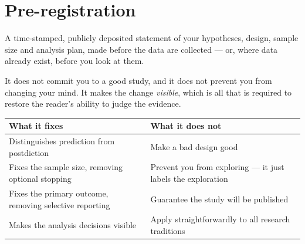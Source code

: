 \section{Pre-registration}

\begin{definitionbox}
A time-stamped, publicly deposited statement of your hypotheses, design,
sample size and analysis plan, made before the data are collected --- or, where
data already exist, before you look at them.

\medskip
It does not commit you to a good study, and it does not prevent you from
changing your mind. It makes the change \emph{visible}, which is all that is
required to restore the reader's ability to judge the evidence.
\end{definitionbox}

\begin{center}
\small
\begin{tabular}{@{}L{4.2cm}L{10.1cm}@{}}
\toprule
\textbf{What it fixes} & \textbf{What it does not} \\
\midrule
Distinguishes prediction from postdiction
  & Make a bad design good \\
Fixes the sample size, removing optional stopping
  & Prevent you from exploring --- it just labels the exploration \\
Fixes the primary outcome, removing selective reporting
  & Guarantee the study will be published \\
Makes the analysis decisions visible
  & Apply straightforwardly to all research traditions \\
\bottomrule
\end{tabular}
\end{center}

